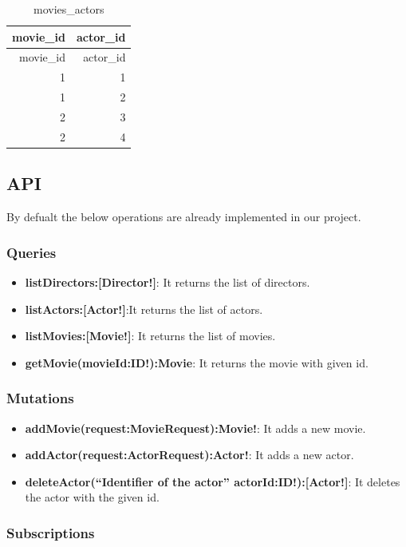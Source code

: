 \documentclass[]{book}
\providecommand{\tightlist}{%
  \setlength{\itemsep}{0pt}\setlength{\parskip}{0pt}}
\begin{document}
\begin{longtable}[]{@{}rr@{}}
\caption{movies\_actors}\tabularnewline
\toprule
movie\_id & actor\_id\tabularnewline
\midrule
\endfirsthead
\toprule
movie\_id & actor\_id\tabularnewline
\midrule
\endhead
1 & 1\tabularnewline
1 & 2\tabularnewline
2 & 3\tabularnewline
2 & 4\tabularnewline
\bottomrule
\end{longtable}

\subsection{API}\label{api}

By defualt the below operations are already implemented in our project.

\subsubsection{Queries}\label{queries}

\begin{itemize}
\tightlist
\item
  \textbf{listDirectors:{[}Director!{]}}: It returns the list of
  directors.
\item
  \textbf{listActors:{[}Actor!{]}}:It returns the list of actors.
\item
  \textbf{listMovies:{[}Movie!{]}}: It returns the list of movies.
\item
  \textbf{getMovie(movieId:ID!):Movie}: It returns the movie with given
  id.
\end{itemize}

\subsubsection{Mutations}\label{mutations}

\begin{itemize}
\tightlist
\item
  \textbf{addMovie(request:MovieRequest):Movie!}: It adds a new movie.
\item
  \textbf{addActor(request:ActorRequest):Actor!}: It adds a new actor.
\item
  \textbf{deleteActor(``Identifier of the actor''
  actorId:ID!):{[}Actor!{]}}: It deletes the actor with the given id.
\end{itemize}

\subsubsection{Subscriptions}\label{subscriptions}
\end{document}
